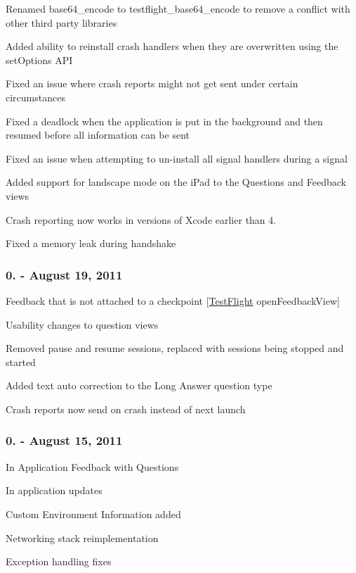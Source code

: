 \begin{DoxyItemize}
\item Renamed base64\-\_\-encode to testflight\-\_\-base64\-\_\-encode to remove a conflict with other third party libraries
\item Added ability to reinstall crash handlers when they are overwritten using the set\-Options A\-P\-I
\item Fixed an issue where crash reports might not get sent under certain circumstances
\item Fixed a deadlock when the application is put in the background and then resumed before all information can be sent
\item Fixed an issue when attempting to un-\/install all signal handlers during a signal
\item Added support for landscape mode on the i\-Pad to the Questions and Feedback views
\item Crash reporting now works in versions of Xcode earlier than 4.
\item Fixed a memory leak during handshake
\end{DoxyItemize}

\subsubsection*{0. -\/ August 19, 2011}


\begin{DoxyItemize}
\item Feedback that is not attached to a checkpoint \mbox{[}\hyperlink{interface_test_flight}{Test\-Flight} open\-Feedback\-View\mbox{]}
\item Usability changes to question views
\item Removed pause and resume sessions, replaced with sessions being stopped and started
\item Added text auto correction to the Long Answer question type
\item Crash reports now send on crash instead of next launch
\end{DoxyItemize}

\subsubsection*{0. -\/ August 15, 2011}


\begin{DoxyItemize}
\item In Application Feedback with Questions
\item In application updates
\item Custom Environment Information added
\item Networking stack reimplementation
\item Exception handling fixes
\end{DoxyItemize}

